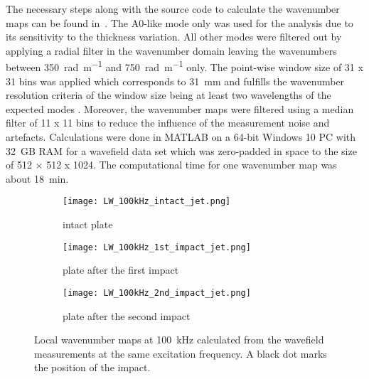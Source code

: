 \documentclass[times,final]{elsarticle}
\begin{document}
The necessary steps along with the source code to calculate the wavenumber maps can be found in~\cite{LUGOVTSOVA2021}. The A0-like mode only was used for the analysis due to its sensitivity to the thickness variation. All other modes were filtered out by applying a radial filter in the wavenumber domain leaving the wavenumbers between \SI{350}{\radian\per\meter} and \SI{750}{\radian\per\meter} only. The point-wise window size of 31 x 31 bins was applied which corresponds to \SI{31}{\milli\meter} and fulfills the wavenumber resolution criteria of the window size being at least two wavelengths of the expected modes \cite{ROGGE2013}. Moreover, the wavenumber maps were filtered using a median filter of 11 x 11 bins to reduce the influence of the measurement noise and artefacts. Calculations were done in MATLAB on a 64-bit Windows 10 PC with 32~GB RAM for a wavefield data set which was zero-padded in space to the size of 512 × 512 x 1024. The computational time for one wavenumber map was about \SI{18}{\minute}.

\begin{figure} [h]
	\centering
	\begin{subfigure}[b]{0.49\textwidth}
		\texttt{[image: LW\_100kHz\_intact\_jet.png]}
		\caption{intact plate}
		\label{fig:LW_intact}
	\end{subfigure}
	\begin{subfigure}[b]{0.49\textwidth}
		\texttt{[image: LW\_100kHz\_1st\_impact\_jet.png]}
		\caption{plate after the first impact}
		\label{fig:LW_1st_impact}
	\end{subfigure}
	\begin{subfigure}[b]{0.49\textwidth}
		\texttt{[image: LW\_100kHz\_2nd\_impact\_jet.png]}
		\caption{plate after the second impact}
		\label{fig:LW_2nd_impact}
	\end{subfigure}
	\caption{Local wavenumber maps at \SI{100}{kHz} calculated from the wavefield measurements at the same excitation frequency. A black dot marks the position of the impact.}
	\label{fig:LW}
\end{figure}
\end{document}
